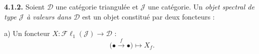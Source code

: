 \medskip\noindent\textbf{4.1.2.}\quad
Soient $\mathcal D$ une catégorie triangulée et $\mathcal J$ une catégorie.
Un \emph{objet spectral de type $\mathcal J$ à valeurs dans $\mathcal D$}
est un objet constitué par deux foncteurs :

a) Un foncteur
$X\colon\mathcal{F}\ell_1(\mathcal J)\longrightarrow\mathcal D$ :
\[
\bigl(\mathord\bullet\xrightarrow f\mathord\bullet\bigr)\longmapsto X_f.
\]
\endgroup
